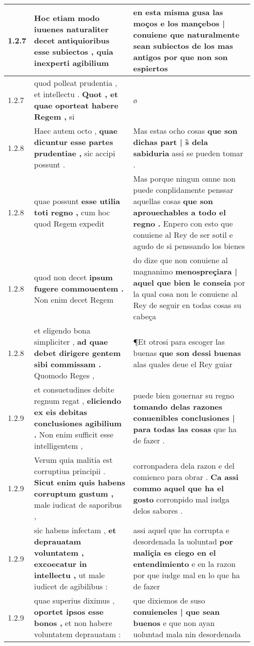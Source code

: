 \begin{tabular}{|p{1cm}|p{6.5cm}|p{6.5cm}|}
1.2.7 & Hoc etiam modo iuuenes naturaliter decet \textbf{ antiquioribus esse subiectos , } quia inexperti agibilium & en esta misma gusa las moços \textbf{ e los mançebos | conuiene que naturalmente sean subiectos de los mas antigos } por que non son espiertos \\\hline
1.2.7 & quod polleat prudentia , et intellectu . \textbf{ Quot , et quae oporteat habere Regem , } si & ø \\\hline
1.2.8 & Haec autem octo , \textbf{ quae dicuntur esse partes prudentiae , } sic accipi possunt . & Mas estas ocho cosas \textbf{ que son dichas part | s̃ dela sabiduria } assi se pueden tomar . \\\hline
1.2.8 & quae possunt \textbf{ esse utilia toti regno , } cum hoc quod Regem expedit & Mas porque ningun omne non puede conplidamente penssar aquellas cosas \textbf{ que son aprouechables a todo el regno . } Enpero con esto que conuiene al Rey de ser sotil e agudo de si penssando los bienes \\\hline
1.2.8 & quod non decet \textbf{ ipsum fugere commouentem . } Non enim decet Regem & do dize que non conuiene al magnanimo \textbf{ menospreçiara | aquel que bien le conseia } por la qual cosa non le conuiene al Rey de seguir en todas cosas su cabeça \\\hline
1.2.8 & et eligendo bona simpliciter , \textbf{ ad quae debet dirigere gentem sibi commissam . } Quomodo Reges , & ¶Et otrosi para escoger las buenas \textbf{ que son dessi buenas } alas quales deue el Rey guiar \\\hline
1.2.9 & et consuetudines debite regnum regat , \textbf{ eliciendo ex eis debitas conclusiones agibilium . } Non enim sufficit esse intelligentem , & puede bien gouernar su regno \textbf{ tomando delas razones conuenibles conclusiones | para todas las cosas } que ha de fazer . \\\hline
1.2.9 & Verum quia malitia est corruptiua principii . \textbf{ Sicut enim quis habens corruptum gustum , } male iudicat de saporibus , & corronpadera dela razon e del comienco para obrar . \textbf{ Ca assi commo aquel que ha el gosto } corronpido mal iudga delos sabores . \\\hline
1.2.9 & sic habens infectam , \textbf{ et deprauatam voluntatem , excoecatur in intellectu , } ut male iudicet de agibilibus : & assi aquel que ha corrupta e desordenada la uoluntad \textbf{ por maliçia es ciego en el entendimiento } e en la razon por que iudge mal en lo que ha de fazer \\\hline
1.2.9 & quae superius diximus , \textbf{ oportet ipsos esse bonos , } et non habere voluntatem deprauatam : & que dixiemos de suso \textbf{ conuieneles | que sean buenos } e que non ayan uoluntad mala nin desordenada \\\hline

\end{tabular}
